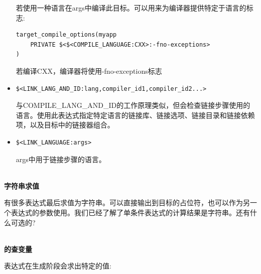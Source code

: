 \begin{itemize}
若使用一种语言在args中编译此目标。可以用来为编译器提供特定于语言的标志:

\begin{lstlisting}[style=styleCMake]
target_compile_options(myapp
	PRIVATE $<$<COMPILE_LANGUAGE:CXX>:-fno-exceptions>
)
\end{lstlisting}

若编译CXX，编译器将使用-fno-exceptions标志

\item 
\begin{lstlisting}[style=styleCMake]
$<LINK_LANG_AND_ID:lang,compiler_id1,compiler_id2...>
\end{lstlisting}

与COMPILE\_LANG\_AND\_ID的工作原理类似，但会检查链接步骤使用的语言。使用此表达式指定特定语言的链接库、链接选项、链接目录和链接依赖项，以及目标中的链接器组合。

\item 
\begin{lstlisting}[style=styleCMake]
$<LINK_LANGUAGE:args>
\end{lstlisting}

args中用于链接步骤的语言。
\end{itemize}

\hspace*{\fill} \\ %
\noindent
\textbf{字符串求值}

有很多表达式最后求值为字符串。可以直接输出到目标的占位符，也可以作为另一个表达式的参数使用。我们已经了解了单条件表达式的计算结果是字符串。还有什么可选的?

\hspace*{\fill} \\ %
\noindent
\textbf{的查变量}

表达式在生成阶段会求出特定的值:

